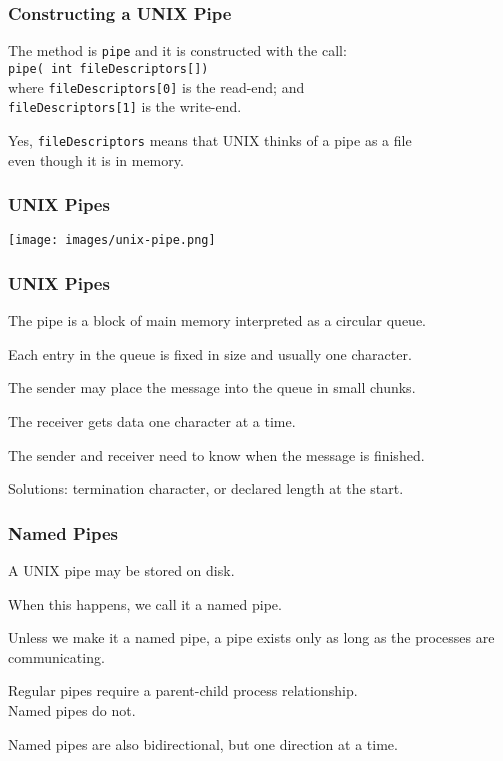 \begin{frame}
\frametitle{Constructing a UNIX Pipe}

The method is \texttt{pipe} and it is constructed with the call: \\
\texttt{pipe( int fileDescriptors[])}\\
\quad where \texttt{fileDescriptors[0]} is the read-end; and\\
\quad \texttt{fileDescriptors[1]} is the write-end. 

Yes, \texttt{fileDescriptors} means that UNIX thinks of a pipe as a file\\
\quad even though it is in memory.


\end{frame}

\begin{frame}
\frametitle{UNIX Pipes}

\begin{center}
	\texttt{[image: images/unix-pipe.png]}
\end{center}

\end{frame}

\begin{frame}
\frametitle{UNIX Pipes}

The pipe is a block of main memory interpreted as a circular queue.

Each entry in the queue is fixed in size and usually one character. 

The sender may place the message into the queue in small chunks.

The receiver gets data one character at a time. 

The sender and receiver need to know when the message is finished. 

Solutions: termination character, or declared length at the start.

\end{frame}

\begin{frame}
\frametitle{Named Pipes}

A UNIX pipe may be stored on disk. 

When this happens, we call it a \alert{named pipe}. 

Unless we make it a named pipe, a pipe exists only as long as the processes are communicating.

Regular pipes require a parent-child process relationship.\\
\quad Named pipes do not.

Named pipes are also bidirectional, but one direction at a time.

\end{frame}

